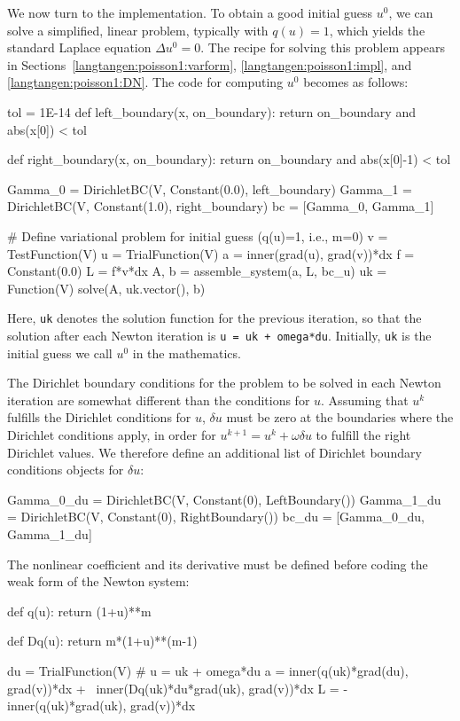 We now turn to the implementation.
To obtain a good initial guess $u^0$, we can solve a simplified, linear
problem, typically with $q(u)=1$, which yields the standard Laplace
equation $\Delta u^0 =0$. The recipe for solving this problem
appears in Sections~\ref{langtangen:poisson1:varform},
\ref{langtangen:poisson1:impl}, and \ref{langtangen:poisson1:DN}. 
The code for computing $u^0$ becomes as follows:
\begin{python}
tol = 1E-14
def left_boundary(x, on_boundary):
    return on_boundary and abs(x[0]) < tol

def right_boundary(x, on_boundary):
    return on_boundary and abs(x[0]-1) < tol

Gamma_0 = DirichletBC(V, Constant(0.0), left_boundary)
Gamma_1 = DirichletBC(V, Constant(1.0), right_boundary)
bc = [Gamma_0, Gamma_1]

# Define variational problem for initial guess (q(u)=1, i.e., m=0)
v = TestFunction(V)
u = TrialFunction(V)
a = inner(grad(u), grad(v))*dx
f = Constant(0.0)
L = f*v*dx
A, b = assemble_system(a, L, bc_u)
uk = Function(V)
solve(A, uk.vector(), b)
\end{python}
Here, {\fontsize{10pt}{10pt}\texttt{uk}} denotes the solution function for the previous
iteration, so that the solution
after each Newton iteration is {\fontsize{10pt}{10pt}\texttt{u = uk + omega*du}}.
Initially, {\fontsize{10pt}{10pt}\texttt{uk}} is the initial guess we call $u^0$ in the mathematics.


The Dirichlet boundary conditions for the problem to be solved in each Newton
iteration are somewhat different than the conditions for $u$. 
Assuming that $u^k$ fulfills the
Dirichlet conditions for $u$, $\delta u$ must be zero at the boundaries 
where the Dirichlet conditions apply, in order for $u^{k+1}=u^k + \omega\delta u$ to fulfill
the right Dirichlet values. We therefore define an additional list of
Dirichlet boundary conditions objects for $\delta u$:
\begin{python}
Gamma_0_du = DirichletBC(V, Constant(0), LeftBoundary())
Gamma_1_du = DirichletBC(V, Constant(0), RightBoundary())
bc_du = [Gamma_0_du, Gamma_1_du]
\end{python}
The nonlinear coefficient and its derivative must be defined
before coding the weak form of the Newton system:
\begin{python}
def q(u):
    return (1+u)**m

def Dq(u):
    return m*(1+u)**(m-1)

du = TrialFunction(V) # u = uk + omega*du
a = inner(q(uk)*grad(du), grad(v))*dx + \
    inner(Dq(uk)*du*grad(uk), grad(v))*dx
L = -inner(q(uk)*grad(uk), grad(v))*dx
\end{python}

